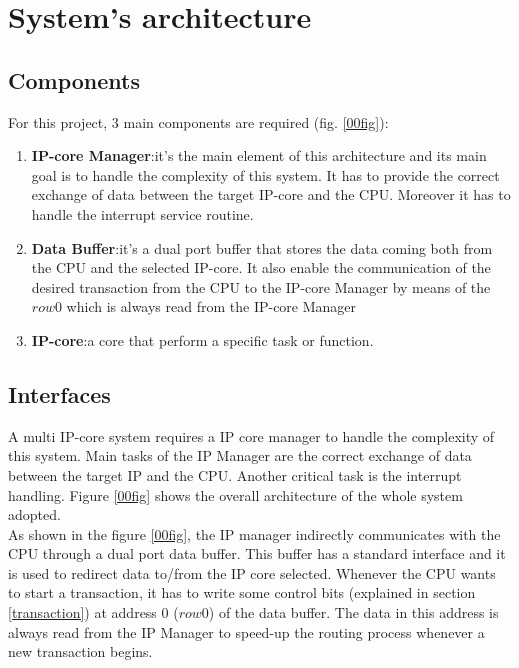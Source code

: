 \chapter{System's architecture}

\section{Components}
For this project, 3 main components are required (fig. \ref{00fig}):
\begin{enumerate}
	\item \textbf{IP-core Manager}:it's the main element of this architecture and its main goal is to handle the complexity of this system. It has to provide the correct exchange of data between the target IP-core and the CPU. Moreover it has to handle the interrupt service routine.
	\item \textbf{Data Buffer}:it's a dual port buffer that stores the data coming both from the CPU and the selected IP-core. It also enable the communication of the desired transaction from the CPU to the IP-core Manager by means of the $ row0 $ which is always read from the IP-core Manager
	\item \textbf{IP-core}:a core that perform a specific task or function.
\end{enumerate}
\section{Interfaces}

A multi IP-core system requires a IP core manager to handle the complexity of this system.
Main tasks of the IP Manager are the correct exchange of data between the target IP and the CPU. Another critical task is the interrupt handling. Figure \ref{00fig} shows the overall architecture of the whole system adopted.\\
	
	As shown in the figure \ref{00fig}, the IP manager indirectly communicates with the CPU through a dual port data buffer. This buffer has a standard interface and it is used to redirect data to/from the IP core selected.
	Whenever the CPU wants to start a transaction, it has to write some control bits (explained in section \ref{transaction}) at address 0 ($ row0 $) of the data buffer.
	The data in this address is always read from the IP Manager to speed-up the routing process whenever a new transaction begins.\\
